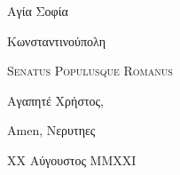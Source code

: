 \documentclass[a4paper,12pt]{article}
\newcommand{\recipientaddress}{
    \begingroup
            \sffamily
            \mdseries
            \footnotesize
            \setlength{\baselineskip}{14pt}
            \setlength{\parskip}{0pt}

            Αγία Σοφία
            
            Κωνσταντινούπολη
            
            \scshape 
            Senatus Populusque Romanus

    \endgroup
}
\begin{document}
    \pagestyle{plain}
    \rmfamily\normalsize
    \setlength{\parskip}{13pt}
    \setlength{\baselineskip}{17pt}

    \recipientaddress\vspace{10mm}

    \normalsize

    Αγαπητέ Χρήστος,

    \lipsum[1]

    \lipsum[2]

    Amen,\newline
    Νερυτηες

    {\footnotesize XX Αύγουστος MMXXI}
\end{document}
